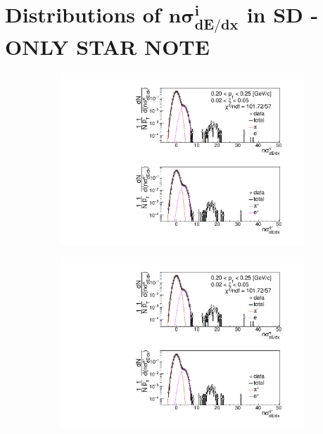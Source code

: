 \chapter[Distributions of $n\sigma^{i}_{dE/dx}$ in SD]{Distributions of $\mathbf{n\sigma^{i}_{dE/dx}}$ in SD - ONLY STAR NOTE}\label{appendix:dEdxFits}
\begin{figure}[h!]
	\centering
	\begin{subfigure}{.33\textwidth}
		\includegraphics[width=\linewidth, page=1]{chapters/chrgSTAR/img/dEdx/fit2019_secondStep_0_0.pdf}
	\end{subfigure}
	\begin{subfigure}{.33\textwidth}
		\includegraphics[width=\linewidth, page=2]{chapters/chrgSTAR/img/dEdx/fit2019_secondStep_0_0.pdf}
	\end{subfigure}

\end{figure}
